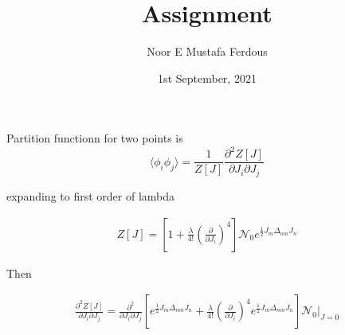 \documentclass[12pt, letterpaper]{article}
\author{Noor E Mustafa Ferdous}
\title{Assignment}
\date{1st September, 2021}
\newcommand*{\1}{\hspace{1pt}}
\begin{document}
    Partition functionn for two points is
    \begin{equation}
        \langle \phi_{i} \phi_{j} \rangle = \frac{1}{Z[J]} \frac{\partial ^{2} Z[J]}{{\partial J_{i} \partial J_{j}}} 
    \end{equation}
    
    expanding to first order of lambda

    \begin{equation}
    \begin{split}
        Z[J] = [1 + \frac{\lambda}{4!}(\frac{\partial}{\partial J_{i}})^{4} ] \mathcal{N}_{0} e^{\frac{1}{2} J_{m} \Delta _{mn} J_{n}}
    \end{split}
    \end{equation}
    
    
    Then

    \begin{equation}
    \begin{split}
        \frac{\partial ^{2} Z[J]}{\partial J_{i} \partial J_{j}} =\frac{\partial ^{2}}{\partial J_{i} \partial J_{j}} [e^{\frac{1}{2} J_{m} \Delta _{mn} J_{n}} + \frac{\lambda}{4!}(\frac{\partial}{\partial J_{i}})^{4} e^{\frac{1}{2} J_{m} \Delta _{mn} J_{n}} ] \mathcal{N}_{0} \Biggr|_{J=0}
    \end{split}
    \end{equation}
\end{document}
